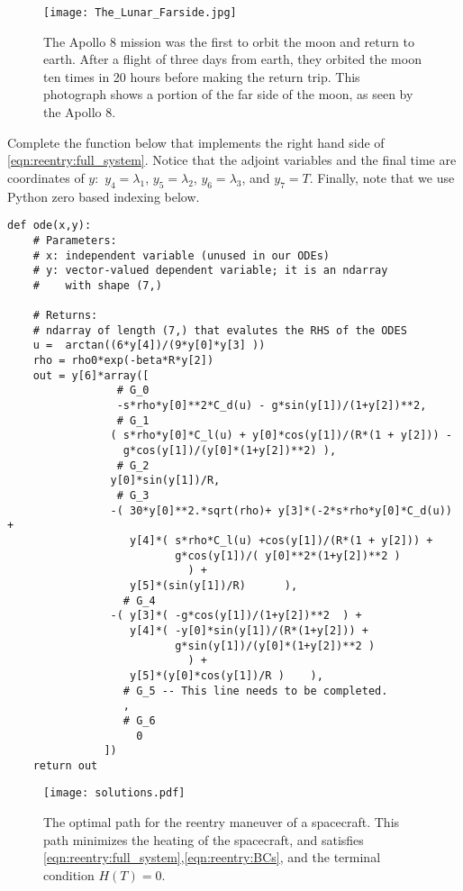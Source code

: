 \begin{figure}
\centering
\texttt{[image: The\_Lunar\_Farside.jpg]}
\caption{ The Apollo 8 mission was the first to orbit the moon and return to earth.
After a flight of three days from earth, they orbited the moon ten times in 20 hours before making the return trip.
This photograph  shows a portion of the far side of the moon, as seen by the Apollo 8.
}
\label{fig:reentry:Lunar_Farside}
\end{figure}



\begin{problem}
Complete the function  below that implements the right hand side of \eqref{eqn:reentry:full_system}.
Notice that the adjoint variables and the final time are coordinates of $y:$ $y_4 = \lambda_1$, $y_5 = \lambda_2$, $y_6=\lambda_3$, and $y_7 = T$. Finally, note that we use Python zero based indexing below.
\begin{lstlisting}
def ode(x,y):
	# Parameters:
	# x: independent variable (unused in our ODEs)
	# y: vector-valued dependent variable; it is an ndarray
	# 	 with shape (7,)

	# Returns:
	# ndarray of length (7,) that evalutes the RHS of the ODES
	u =	 arctan((6*y[4])/(9*y[0]*y[3] ))
	rho = rho0*exp(-beta*R*y[2])
	out = y[6]*array([
				 # G_0
				 -s*rho*y[0]**2*C_d(u) - g*sin(y[1])/(1+y[2])**2,
				 # G_1
				( s*rho*y[0]*C_l(u) + y[0]*cos(y[1])/(R*(1 + y[2])) -
				  g*cos(y[1])/(y[0]*(1+y[2])**2) ),
				 # G_2
				y[0]*sin(y[1])/R,
				 # G_3
				-( 30*y[0]**2.*sqrt(rho)+ y[3]*(-2*s*rho*y[0]*C_d(u)) +
				   y[4]*( s*rho*C_l(u) +cos(y[1])/(R*(1 + y[2])) +
						  g*cos(y[1])/( y[0]**2*(1+y[2])**2 )
							) +
				   y[5]*(sin(y[1])/R)	   ),
				  # G_4
				-( y[3]*( -g*cos(y[1])/(1+y[2])**2	) +
				   y[4]*( -y[0]*sin(y[1])/(R*(1+y[2])) +
						  g*sin(y[1])/(y[0]*(1+y[2])**2 )
							) +
				   y[5]*(y[0]*cos(y[1])/R )	   ),
				  # G_5 -- This line needs to be completed.
				  ,
				  # G_6
					0
			   ])
	return out
\end{lstlisting}
\end{problem}

\begin{figure}
\centering
\texttt{[image: solutions.pdf]}
\caption{The optimal path for the reentry maneuver of a spacecraft.
This path minimizes the heating of the spacecraft, and satisfies  \eqref{eqn:reentry:full_system},\eqref{eqn:reentry:BCs}, and the terminal condition $H(T) = 0$.
}
\label{fig:reentry:solutions}
\end{figure}


